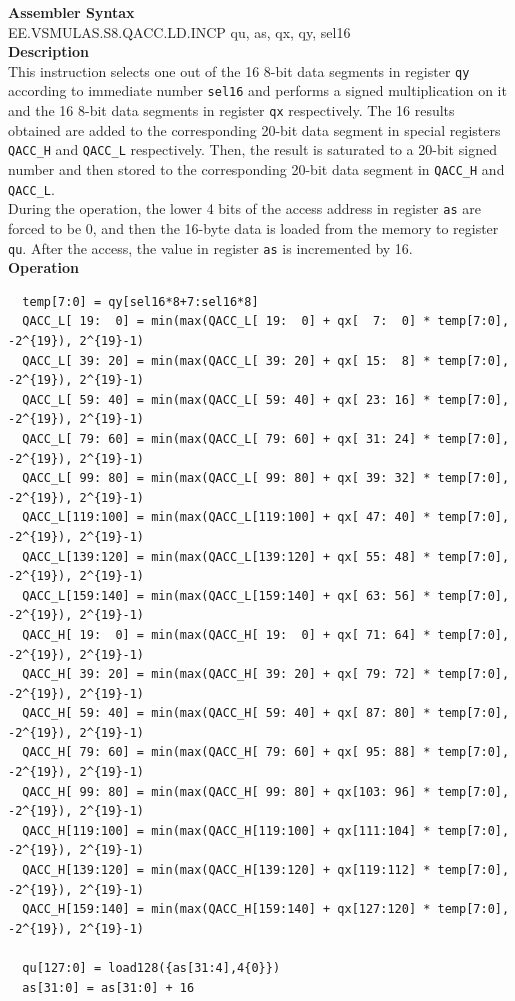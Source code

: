 \textbf{Assembler Syntax} \\
EE.VSMULAS.S8.QACC.LD.INCP qu, as, qx, qy, sel16 \\
\textbf{Description} \\
This instruction selects one out of the 16 8-bit data segments in register \lstinline{qy} according to immediate number \lstinline{sel16} and performs a signed multiplication on it and the 16 8-bit data segments in register \lstinline{qx} respectively. The 16 results obtained are added to the corresponding 20-bit data segment in special registers \lstinline{QACC_H} and \lstinline{QACC_L} respectively. Then, the result is saturated to a 20-bit signed number and then stored to the corresponding 20-bit data segment in \lstinline{QACC_H} and \lstinline{QACC_L}.\\
During the operation, the lower 4 bits of the access address in register \lstinline{as} are forced to be 0, and then the 16-byte data is loaded from the memory to register \lstinline{qu}. After the access, the value in register \lstinline{as} is incremented by 16.\\
\textbf{Operation}
\begin{lstlisting}
  temp[7:0] = qy[sel16*8+7:sel16*8]
  QACC_L[ 19:  0] = min(max(QACC_L[ 19:  0] + qx[  7:  0] * temp[7:0], -2^{19}), 2^{19}-1)
  QACC_L[ 39: 20] = min(max(QACC_L[ 39: 20] + qx[ 15:  8] * temp[7:0], -2^{19}), 2^{19}-1)
  QACC_L[ 59: 40] = min(max(QACC_L[ 59: 40] + qx[ 23: 16] * temp[7:0], -2^{19}), 2^{19}-1)
  QACC_L[ 79: 60] = min(max(QACC_L[ 79: 60] + qx[ 31: 24] * temp[7:0], -2^{19}), 2^{19}-1)
  QACC_L[ 99: 80] = min(max(QACC_L[ 99: 80] + qx[ 39: 32] * temp[7:0], -2^{19}), 2^{19}-1)
  QACC_L[119:100] = min(max(QACC_L[119:100] + qx[ 47: 40] * temp[7:0], -2^{19}), 2^{19}-1)
  QACC_L[139:120] = min(max(QACC_L[139:120] + qx[ 55: 48] * temp[7:0], -2^{19}), 2^{19}-1)
  QACC_L[159:140] = min(max(QACC_L[159:140] + qx[ 63: 56] * temp[7:0], -2^{19}), 2^{19}-1)
  QACC_H[ 19:  0] = min(max(QACC_H[ 19:  0] + qx[ 71: 64] * temp[7:0], -2^{19}), 2^{19}-1)
  QACC_H[ 39: 20] = min(max(QACC_H[ 39: 20] + qx[ 79: 72] * temp[7:0], -2^{19}), 2^{19}-1)
  QACC_H[ 59: 40] = min(max(QACC_H[ 59: 40] + qx[ 87: 80] * temp[7:0], -2^{19}), 2^{19}-1)
  QACC_H[ 79: 60] = min(max(QACC_H[ 79: 60] + qx[ 95: 88] * temp[7:0], -2^{19}), 2^{19}-1)
  QACC_H[ 99: 80] = min(max(QACC_H[ 99: 80] + qx[103: 96] * temp[7:0], -2^{19}), 2^{19}-1)
  QACC_H[119:100] = min(max(QACC_H[119:100] + qx[111:104] * temp[7:0], -2^{19}), 2^{19}-1)
  QACC_H[139:120] = min(max(QACC_H[139:120] + qx[119:112] * temp[7:0], -2^{19}), 2^{19}-1)
  QACC_H[159:140] = min(max(QACC_H[159:140] + qx[127:120] * temp[7:0], -2^{19}), 2^{19}-1)

  qu[127:0] = load128({as[31:4],4{0}})
  as[31:0] = as[31:0] + 16
\end{lstlisting}

